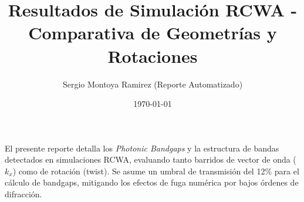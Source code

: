 \documentclass{article}
\begin{document}
\title{Resultados de Simulación RCWA - Comparativa de Geometrías y Rotaciones}
\author{Sergio Montoya Ramirez (Reporte Automatizado)}
\date{\today}
\maketitle

El presente reporte detalla los \textit{Photonic Bandgaps} y la estructura de bandas detectados en simulaciones RCWA, evaluando tanto barridos de vector de onda ($k_x$) como de rotación (twist).
Se asume un umbral de transmisión del 12\% para el cálculo de bandgaps, mitigando los efectos de fuga numérica por bajos órdenes de difracción.
\clearpage





\end{document}
